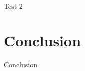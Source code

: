 \documentclass[12pt]{article}
\begin{document}
\par{Test 2}

\section{Conclusion}

\par{Conclusion}






\end{document}
